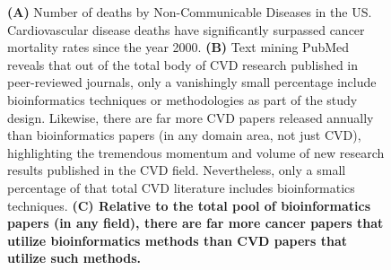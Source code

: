 \documentclass[letter]{bioinfo}
\begin{document}
\begin{figure}
	\caption{\textbf{(A)} Number of deaths by Non-Communicable Diseases in the US.  Cardiovascular disease deaths have significantly surpassed cancer mortality rates since the year 2000.  \textbf{(B)} Text mining PubMed reveals that out of the total body of CVD research published in peer-reviewed journals, only a vanishingly small percentage include bioinformatics techniques or methodologies as part of the study design.  Likewise, there are far more CVD papers released annually than bioinformatics papers (in any domain area, not just CVD), highlighting the tremendous momentum and volume of new research results published in the CVD field.  Nevertheless, only a small percentage of that total CVD literature includes bioinformatics techniques.  \textbf{(C) Relative to the total pool of bioinformatics papers (in any field), there are far more cancer papers that utilize bioinformatics methods than CVD papers that utilize such methods.}}
	\label{fig:figure1}
\end{figure}
\end{document}
